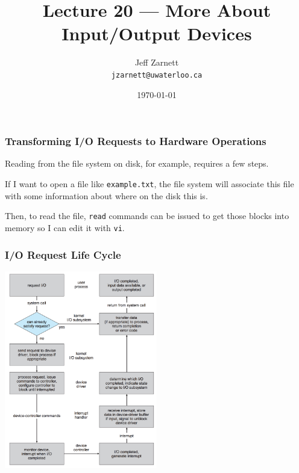 

\title{Lecture 20 --- More About Input/Output Devices }

\author{Jeff Zarnett \\ \small \texttt{jzarnett@uwaterloo.ca}}
\date{\today}




\begin{frame}
  \titlepage

 \end{frame}
 
\begin{frame}
\frametitle{Transforming I/O Requests to Hardware Operations}

Reading from the file system on disk, for example, requires a few steps. 

If I want to open a file like \texttt{example.txt}, the file system will associate this file with some information about where on the disk this is. 

Then, to read the file, \texttt{read} commands can be issued to get those blocks into memory so I can edit it with \texttt{vi}.

\end{frame}

\begin{frame}
\frametitle{I/O Request Life Cycle}

\begin{center}
	\includegraphics[width=0.5\textwidth]{images/io-lifecycle.png}
\end{center}

\end{frame}

